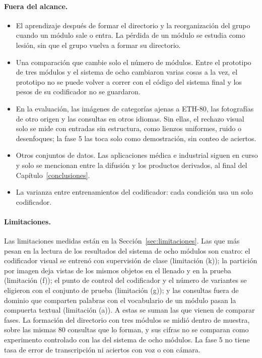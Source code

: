 \paragraph{Fuera del alcance.}
\begin{itemize}
    \item El aprendizaje después de formar el directorio y la reorganización del grupo
    cuando un módulo sale o entra.
    La pérdida de un módulo se estudia como lesión, sin que el grupo vuelva a formar su
    directorio.
    \item Una comparación que cambie solo el número de módulos.
    Entre el prototipo de tres módulos y el sistema de ocho cambiaron varias cosas a la
    vez, el prototipo no se puede volver a correr con el código del sistema final y los
    pesos de su codificador no se guardaron.
    \item En la evaluación, las imágenes de categorías ajenas a ETH-80, las fotografías de
    otro origen y las consultas en otros idiomas.
    Sin ellas, el rechazo visual solo se mide con entradas sin estructura, como lienzos
    uniformes, ruido o desenfoques; la fase 5 las toca solo como demostración, sin conteo
    de aciertos.
    \item Otros conjuntos de datos.
    Las aplicaciones médica e industrial siguen en curso y solo se mencionan entre la
    difusión y los productos derivados, al final del Capítulo~\ref{conclusiones}.
    \item La varianza entre entrenamientos del codificador: cada condición usa un solo
    codificador.
\end{itemize}

\paragraph{Limitaciones.}
Las limitaciones medidas están en la Sección~\ref{sec:limitaciones}.
Las que más pesan en la lectura de los resultados del sistema de ocho módulos son cuatro:
el codificador visual se entrenó con supervisión de clase (limitación (k));
la partición por imagen deja vistas de los mismos objetos en el llenado y en la prueba
(limitación (f));
el punto de control del codificador y el número de variantes se eligieron con el
conjunto de prueba (limitación (g));
y las consultas fuera de dominio que comparten palabras con el vocabulario de un
módulo pasan la compuerta textual (limitación (a)).
A estas se suman las que vienen de comparar fases.
La formación del directorio con tres módulos se midió dentro de muestra, sobre las mismas
80 consultas que lo forman, y sus cifras no se comparan como experimento controlado con
las del sistema de ocho módulos.
La fase 5 no tiene tasa de error de transcripción ni aciertos con voz o con cámara.

